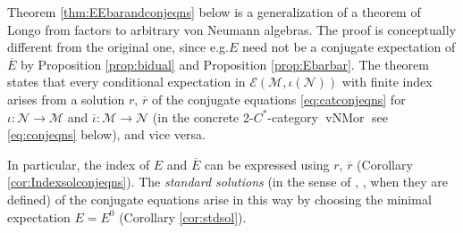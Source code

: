 \documentclass[11pt,a4paper]{article}
\makeatletter
\newcommand{\rbar}{{\overline{r}}}
\newcommand{\iotabar}{{\overline{\iota}}}
\newcommand{\Ebar}{{\overline{E}}}
\newcommand{\E}{\mathcal{E}}
\newcommand{\M}{\mathcal{M}}
\newcommand{\N}{\mathcal{N}}
\DeclareMathOperator{\vNMor}{vNMor}
\DeclareRobustCommand{\eg}{e.g.\@\xspace}
\DeclareRobustCommand{\Thm}{Thm.\@\xspace}
\newcommand{\Cstar}{$C^\ast$\@\xspace}
\theoremstyle{plain}
\theoremstyle{definition}
\theoremstyle{remark}
\numberwithin{equation}{section}%
\makeatother
\begin{document}
Theorem \ref{thm:EEbarandconjeqns} below is a generalization of a theorem of Longo \cite[\Thm 5.2]{Lon90} from factors to arbitrary von Neumann algebras. The proof is conceptually different from the original one, since \eg $E$ need not be a conjugate expectation of $\Ebar$ by Proposition \ref{prop:bidual} and Proposition \ref{prop:Ebarbar}.
The theorem states that every conditional expectation in $\E(\M,\iota(\N))$ with finite index arises from a solution $r$, $\rbar$ of the conjugate equations \eqref{eq:catconjeqns} for $\iota:\N\to\M$ and $\iotabar:\M\to\N$ (in the concrete 2-\Cstar-category $\vNMor$ see \eqref{eq:conjeqns} below), and vice versa. 

In particular, the index of $E$ and $\Ebar$ can be expressed using  $r$, $\rbar$ (Corollary \ref{cor:Indexsolconjeqns}). The \emph{standard solutions} (in the sense of \cite{LoRo97}, \cite{GiLo19}, when they are defined) of the conjugate equations arise in this way by choosing the minimal expectation $E=E^0$ (Corollary \ref{cor:stdsol}).
\end{document}
